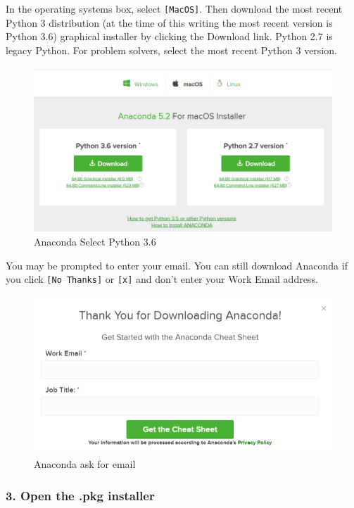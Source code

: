 \documentclass{book}
\makeatletter
\def\maxwidth{\ifdim\Gin@nat@width>\linewidth\linewidth
    \else\Gin@nat@width\fi}
\let\Oldincludegraphics\includegraphics
\renewcommand{\includegraphics}[1]{\Oldincludegraphics[width=.8\maxwidth]{#1}}
\makeatother
\begin{document}
In the operating systems box, select \lstinline![MacOS]!. Then download
the most recent Python 3 distribution (at the time of this writing the
most recent version is Python 3.6) graphical installer by clicking the
Download link. Python 2.7 is legacy Python. For problem solvers, select
the most recent Python 3 version.

\begin{figure}
\centering
\includegraphics{images/anaconda_download_mac.png}
\caption{Anaconda Select Python 3.6}
\end{figure}

You may be prompted to enter your email. You can still download Anaconda
if you click \lstinline![No Thanks]! or \lstinline![x]! and don't enter
your Work Email address.

\begin{figure}
\centering
\includegraphics{images/anaconda_download_mac_ask_for_email.png}
\caption{Anaconda ask for email}
\end{figure}
    




    
        \subsubsection{3. Open the .pkg
installer}\label{open-the-.pkg-installer}
\end{document}

